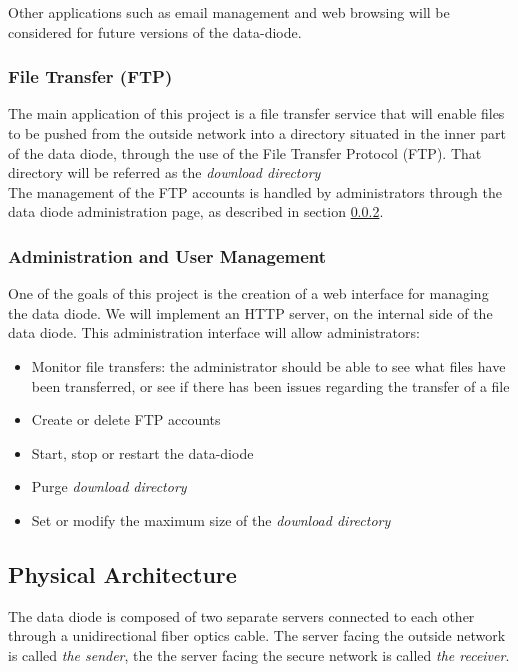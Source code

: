 \documentclass[a4paper,11pt]{article}
\begin{document}
Other applications such as email management and web browsing will be considered for future versions of the data-diode.

\subsubsection{File Transfer (FTP)}
The main application of this project is a file transfer service that will enable files to be pushed from the outside network into a directory situated in the inner part of the data diode, through the use of the File Transfer Protocol (FTP). That directory will be referred as the \textit{download directory}\\

The management of the FTP accounts is handled by administrators through the data diode administration page, as described in section \ref{sec:administration}.

\subsubsection{Administration and User Management}
\label{sec:administration}
One of the goals of this project is the creation of a web interface for managing the data diode. We will implement an HTTP server, on the internal side of the data diode. This administration interface will allow administrators:

\begin{itemize}
\item{Monitor file transfers: the administrator should be able to see what files have been transferred, or see if there has been issues regarding the transfer of a file}
\item{Create or delete FTP accounts}
\item{Start, stop or restart the data-diode}
\item{Purge \textit{download directory}}
\item{Set or modify the maximum size of the \textit{download directory}}
\end{itemize} 

\subsection{Physical Architecture}
The data diode is composed of two separate servers connected to each other through a unidirectional fiber optics cable. The server facing the outside network is called \textit{the sender}, the the server facing the secure network is called \textit{the receiver}.\\
\end{document}
